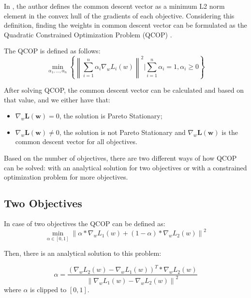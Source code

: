 \documentclass[letterpaper]{article}
\begin{document}
In \cite{desideri:hal-00768935}, the author defines the common descent vector as a minimum L2 norm element in the convex hull of the gradients of each objective. Considering this definition, finding the weights in common descent vector can be formulated as the Quadratic Constrained Optimization Problem (QCOP) \cite{desideri:hal-00768935}.

The QCOP is defined as follows:
\begin{equation}
    \min _{\alpha_{1}, \ldots, \alpha_{n}}\left\{\left\|\sum_{i=1}^{n} \alpha_{i} \nabla_{w} L_{i}(w)\right\|^{2} | \sum_{i=1}^{n} \alpha_{i}=1, \alpha_{i} \geq 0\right\}
\end{equation}{}

After solving QCOP, the common descent vector can be calculated and based on that value, and we either have that:
\begin{itemize}
    \item $\nabla_{w} \mathbf{L(w)}=0$, the solution is Pareto Stationary;
    \item $\nabla_{w} \mathbf{L(w)}\neq0$, the solution is not Pareto Stationary and $\nabla_{w} \mathbf{L(w)}$ is the common descent vector for all objectives.
\end{itemize}

Based on the number of objectives, there are two different ways of how QCOP can be solved: with an analytical solution for two objectives or with a constrained optimization problem for more objectives.

\subsection{Two Objectives}

In case of two objectives the QCOP can be defined as:
\begin{equation}
\label{eq:qcoptwoobjectives}
    \min _{\alpha \in[0,1]}\left\|\alpha * \nabla_{w} L_{1}(w)+(1-\alpha) * \nabla_{w} L_{2}(w)\right\|^{2}
\end{equation}

Then, there is an analytical solution to this problem:

\begin{equation}
\label{eq:alphatwoobjectives}
    \alpha=\frac{(\nabla_{w} L_{2}(w)-\nabla_{w} L_{1}(w))^{T} * \nabla_{w} L_{2}(w)}{\left\|\nabla_{w} L_{1}(w)-\nabla_{w} L_{2}(w)\right\|^{2}}
\end{equation}
where $\alpha$ is clipped to $[0, 1]$.
\end{document}
